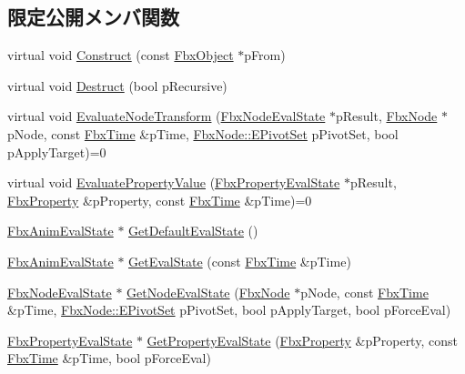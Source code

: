 \subsection*{限定公開メンバ関数}
\begin{DoxyCompactItemize}
\item 
virtual void \hyperlink{class_fbx_anim_evaluator_a9f167a7fd55aa593d191fdf014c1b3bd}{Construct} (const \hyperlink{class_fbx_object}{Fbx\+Object} $\ast$p\+From)
\item 
virtual void \hyperlink{class_fbx_anim_evaluator_ac425dd202ceb6c0e5adfc86d8c901dd0}{Destruct} (bool p\+Recursive)
\item 
virtual void \hyperlink{class_fbx_anim_evaluator_a6de6ef5ab77169192cd39baf76f14037}{Evaluate\+Node\+Transform} (\hyperlink{class_fbx_node_eval_state}{Fbx\+Node\+Eval\+State} $\ast$p\+Result, \hyperlink{class_fbx_node}{Fbx\+Node} $\ast$p\+Node, const \hyperlink{class_fbx_time}{Fbx\+Time} \&p\+Time, \hyperlink{class_fbx_node_ae62b7311ac4727654cdf1ebd5cbf7343}{Fbx\+Node\+::\+E\+Pivot\+Set} p\+Pivot\+Set, bool p\+Apply\+Target)=0
\item 
virtual void \hyperlink{class_fbx_anim_evaluator_aa29759ee76b1cbb0ced4fee1508d5d84}{Evaluate\+Property\+Value} (\hyperlink{class_fbx_property_eval_state}{Fbx\+Property\+Eval\+State} $\ast$p\+Result, \hyperlink{class_fbx_property}{Fbx\+Property} \&p\+Property, const \hyperlink{class_fbx_time}{Fbx\+Time} \&p\+Time)=0
\item 
\hyperlink{class_fbx_anim_eval_state}{Fbx\+Anim\+Eval\+State} $\ast$ \hyperlink{class_fbx_anim_evaluator_a0e222bee0038d2324e38a996cc40527e}{Get\+Default\+Eval\+State} ()
\item 
\hyperlink{class_fbx_anim_eval_state}{Fbx\+Anim\+Eval\+State} $\ast$ \hyperlink{class_fbx_anim_evaluator_ae09fad8424850027d8534845dc3f950d}{Get\+Eval\+State} (const \hyperlink{class_fbx_time}{Fbx\+Time} \&p\+Time)
\item 
\hyperlink{class_fbx_node_eval_state}{Fbx\+Node\+Eval\+State} $\ast$ \hyperlink{class_fbx_anim_evaluator_adf64b2948f34228e9723939c9347474c}{Get\+Node\+Eval\+State} (\hyperlink{class_fbx_node}{Fbx\+Node} $\ast$p\+Node, const \hyperlink{class_fbx_time}{Fbx\+Time} \&p\+Time, \hyperlink{class_fbx_node_ae62b7311ac4727654cdf1ebd5cbf7343}{Fbx\+Node\+::\+E\+Pivot\+Set} p\+Pivot\+Set, bool p\+Apply\+Target, bool p\+Force\+Eval)
\item 
\hyperlink{class_fbx_property_eval_state}{Fbx\+Property\+Eval\+State} $\ast$ \hyperlink{class_fbx_anim_evaluator_a20ef23a07b86771090c64ec5f3cc7ced}{Get\+Property\+Eval\+State} (\hyperlink{class_fbx_property}{Fbx\+Property} \&p\+Property, const \hyperlink{class_fbx_time}{Fbx\+Time} \&p\+Time, bool p\+Force\+Eval)
\end{DoxyCompactItemize}
